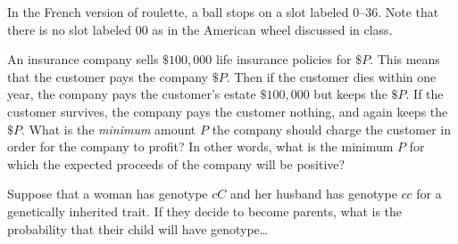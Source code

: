 \documentclass[addpoints,12pt]{exam}
\begin{document}
\begin{questions}

\question[12] In the French version of roulette, a ball stops
on a slot labeled $0$--$36$. Note that there is no slot labeled
$00$ as in the American wheel discussed in class.

\question[12] An insurance company sells $\$100,000$
life insurance policies for $\$P$. This means that the customer
pays the company $\$P$. Then
if the customer dies within one year, the company
pays the customer's estate $\$100,000$ but keeps the $\$P$.
If the customer survives, the company pays the customer nothing, and again
keeps the $\$P$. What is the {\em minimum} amount $P$ the
company should charge the customer in order
for the company to profit? In other words, what is the minimum
$P$ for which the expected proceeds of the company will be positive?

\question[12]
Suppose that a woman has genotype $cC$
and her husband has genotype $cc$ for a
genetically inherited trait.
If they decide to become parents,
what is the probability that their child will
have genotype\dots
{}


\end{questions}
\end{document}
